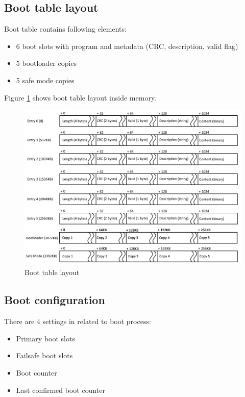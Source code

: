 \subsection{Boot table layout}
Boot table contains following elements:
\begin{itemize}
	\item 6 boot slots with \obc program and metadata (CRC, description, valid flag)
	\item 5 bootloader copies
	\item 5 safe mode copies
\end{itemize}

Figure \ref{fig:func:boottable} shows boot table layout inside memory.

\begin{figure}
	\includegraphics[width=20cm,angle=90]{img/boot-table.png}
	\caption{Boot table layout}
	\label{fig:func:boottable}
\end{figure}

\subsection{Boot configuration}
There are 4 settings in  related to boot process:
\begin{itemize}
	\item Primary boot slots
	\item Failsafe boot slots
	\item Boot counter
	\item Last confirmed boot counter
\end{itemize}

